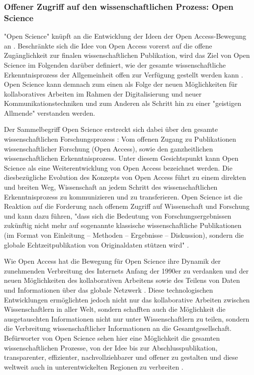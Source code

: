 \subsubsection{Offener Zugriff auf den wissenschaftlichen Prozess: Open Science}

"Open Science" knüpft an die Entwicklung der Ideen der Open Access-Bewegung an \cite{garcia_2010_open}. Beschränkte sich die Idee von Open Access vorerst auf die offene Zugänglichkeit zur finalen wissenschaftlichen Publikation, wird das Ziel von Open Science im Folgenden darüber definiert, wie der gesamte wissenschaftliche Erkenntnisprozess der Allgemeinheit offen zur Verfügung gestellt werden kann \cite{grand_2012_open}. Open Science kann demnach zum einen als Folge der neuen Möglichkeiten für kollaboratives Arbeiten im Rahmen der Digitalisierung und neuer Kommunikationstechniken und zum Anderen als Schritt hin zu einer "geistigen Allmende" \cite{naeder_2010_open} verstanden werden.

Der Sammelbegriff Open Science erstreckt sich dabei über den gesamte wissenschaftlichen Forschungsprozess \cite{Scheliga_2014}: Vom offenen Zugang zu Publikationen wissenschaftlicher Forschung (Open Access), sowie den ganzheitlichen wissenschaftlichen Erkenntnisprozess. Unter diesem Gesichtspunkt kann Open Science als eine Weiterentwicklung von Open Access bezeichnet werden. Die diesbezügliche Evolution des Konzepts von Open Access führt zu einem direkten und breiten Weg, Wissenschaft an jedem Schritt des wissenschaftlichen Erkenntnisprozess zu kommunizieren und zu transferieren. Open Science ist die Reaktion auf die Forderung nach offenem Zugriff auf Wissenschaft und Forschung und kann dazu führen, "dass sich die Bedeutung von Forschungsergebnissen zukünftig nicht mehr auf sogenannte klassische wissenschaftliche Publikationen (im Format von Einleitung – Methoden – Ergebnisse – Diskussion), sondern die globale Echtzeitpublikation von Originaldaten stützen wird" \cite{Stengel_2013}.

Wie Open Access hat die Bewegung für Open Science ihre Dynamik der zunehmenden Verbreitung des Internets Anfang der 1990er zu verdanken \cite{Lievrouw_2010} und der neuen Möglichkeiten des kollaborativen Arbeitens sowie des Teilens von Daten und Informationen über das globale Netzwerk \cite{Meyer_2013}. Diese technologischen Entwicklungen ermöglichten jedoch nicht nur das kollaborative Arbeiten zwischen Wissenschaftlern in aller Welt, sondern schafften auch die Möglichkeit die ausgetauschten Informationen nicht nur unter Wissenschaftlern zu teilen, sondern die Verbreitung wissenschaftlicher Informationen an die Gesamtgesellschaft. Befürworter von Open Science sehen hier eine Möglichkeit die gesamten wissenschaftlichen Prozesse, von der Idee bis zur Abschlusspublikation, transparenter, effizienter, nachvollziehbarer und offener zu gestalten \cite{Woelfle_2011} und diese weltweit auch in unterentwickelten Regionen zu verbreiten \cite{yiotis_2013_open}.

